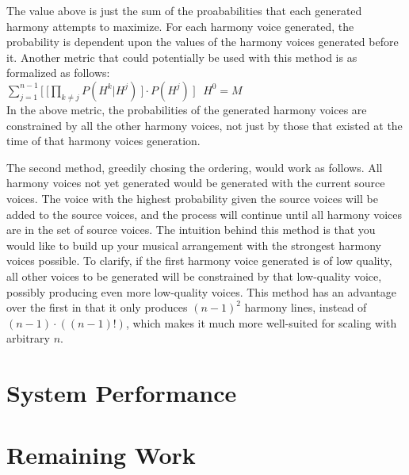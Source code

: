 \documentclass{sig-alternate}
\begin{document}
The value above is just the sum of the proababilities that each generated harmony attempts to maximize. For each harmony voice generated, the probability is dependent upon the values of the harmony voices generated before it. Another metric that could potentially be used with this method is as formalized as follows: \\

$\sum_{j = 1}^{n - 1} \lbrack\ \lbrack\prod_{k \neq j} P(H^{k} | H^{j})\ \rbrack \cdot P(H^{j})\ \rbrack\ \ \ H^{0} = M$\\

In the above metric, the probabilities of the generated harmony voices are constrained by all the other harmony voices, not just by those that existed at the time of that harmony voices generation. 

The second method, greedily chosing the ordering, would work as follows. All harmony voices not yet generated would be generated with the current source voices. The voice with the highest probability given the source voices will be added to the source voices, and the process will continue until all harmony voices are in the set of source voices. The intuition behind this method is that you would like to build up your musical arrangement with the strongest harmony voices possible. To clarify, if the first harmony voice generated is of low quality, all other voices to be generated will be constrained by that low-quality voice, possibly producing even more low-quality voices. This method has an advantage over the first in that it only produces $(n-1)^{2}$ harmony lines, instead of $(n -1)\cdot((n-1)!)$, which makes it much more well-suited for scaling with arbitrary $n$.

\section{System Performance}
\label{sec:sys_perform}


\section{Remaining Work}
\label{sec:remaining_work}



\appendix
\label{app}
\end{document}
